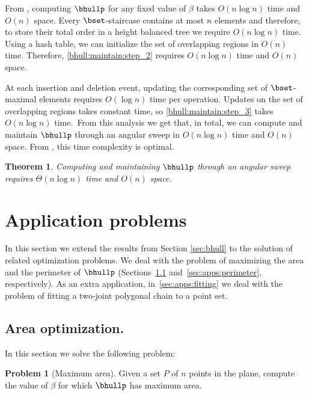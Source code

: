 \documentclass[11pt,letterpaper,english]{article}
\newtheorem{theorem}{Theorem}
\theoremstyle{definition}
\newtheorem{problem}{Problem}
\begin{document}
From , computing $\bhullp$ for any
fixed value of $\beta$ takes $O(n \log n)$ time and $O(n)$
space. Every $\bset$-staircase contains at most $n$ elements and
therefore, to store their total order in a height balanced tree we
require $O(n \log n)$ time.
Using a hash table, we can initialize the set of overlapping regions
in $O(n)$ time. Therefore,
\cref{bhull:maintain:step_2} requires $O(n \log n)$ time and $O(n)$
space.

At each insertion and deletion event, updating the corresponding set
of $\bset$-maximal elements requires $O(\log n)$ time per
operation. Updates on the set of overlapping regions takes constant
time, so \cref{bhull:maintain:step_3} takes $O(n \log n)$ time.~From
this analysis we get that, in total, we can compute and maintain
$\bhullp$ through an angular sweep in $O(n \log n)$ time and $O(n)$
space.  From , this time complexity
is optimal.

\begin{theorem}
  Computing and maintaining $\bhullp$ through an angular sweep
  requires $\Theta(n \log n)$ time and $O(n)$ space.
\end{theorem}

\section{Application problems}\label{sec:applications}

In this section we extend the results from Section \ref{sec:bhull} to
the solution of related optimization problems. We deal with the
problem of maximizing the area and the perimeter of $\bhullp$ (Sections~\ref{sec:apps:area} and~\ref{sec:apps:perimeter}, respectively). As an extra application, in~\ref{sec:apps:fitting} we deal with the
problem of fitting a two-joint polygonal chain to a point set.

\subsection{Area optimization.}\label{sec:apps:area}

In this section we solve the following problem:

\begin{problem}[Maximum area]
  Given a set $P$ of $n$ points in the plane, compute the value of
  $\beta$ for which $\bhullp$ has maximum area.
\end{problem}
\end{document}
